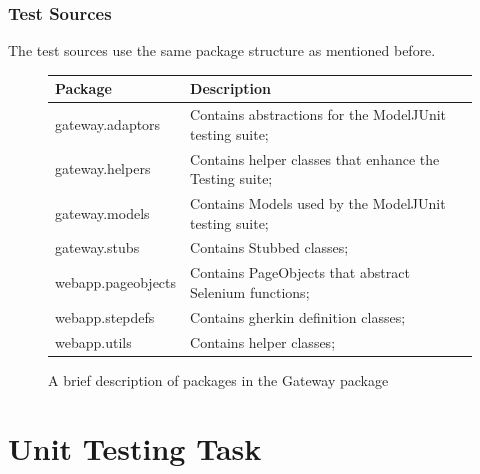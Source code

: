 \documentclass[11pt, a4paper]{article}
\begin{document}
        \subsubsection{Test Sources}
            The test sources use the same package structure as mentioned before.
            \begin{figure}[H]
                \centering
                \begin{tabular} { p{4.5cm} | p{4.5cm} }
                    Package & Description \\
                    \hline
                    gateway.adaptors & Contains abstractions for the ModelJUnit testing suite; \\
                    gateway.helpers & Contains helper classes that enhance the Testing suite; \\
                    gateway.models & Contains Models used by the ModelJUnit testing suite; \\
                    gateway.stubs & Contains Stubbed classes; \\
                    webapp.pageobjects & Contains PageObjects that abstract Selenium functions; \\
                    webapp.stepdefs & Contains gherkin definition classes; \\
                    webapp.utils & Contains helper classes; \\
                \end{tabular}
                \caption{A brief description of packages in the Gateway package}
            \end{figure}
\section{Unit Testing Task}
\end{document}
